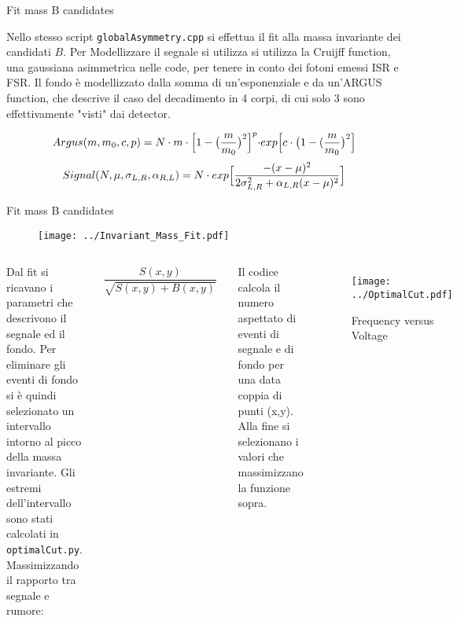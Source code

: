 \documentclass[8pt,a4paper]{beamer}
\begin{document}
\begin{frame}{Fit mass B candidates}

Nello stesso script \texttt{globalAsymmetry.cpp} si effettua il fit alla massa invariante dei candidati $B$. Per Modellizzare il segnale si utilizza si utilizza la Cruijff function, una gaussiana asimmetrica nelle code, per tenere in conto dei fotoni emessi ISR e FSR. Il fondo è modellizzato dalla somma di un'esponenziale e da un'ARGUS function, che descrive il caso del decadimento in 4 corpi, di cui solo 3 sono effettivamente "visti" dai detector.

\begin{equation}
Argus(m,m_{0},c,p) = N \cdot m \cdot \Bigl[1 - \big(\frac{m}{m_{0}} \big)^{2} \Bigl]^{p} \cdot exp \Bigl[c \cdot \big(1 - (\frac{m}{m_{0}}\big)^{2}  \Bigl]
\end{equation}
\begin{equation}
Signal(N,\mu, \sigma_{L,R}, \alpha_{R,L}) = N \cdot exp \Bigl[  \dfrac{ - (x - \mu)^2}{2 \sigma_{L,R}^{2} + \alpha_{L,R} (x - \mu)^2  }	\Bigl]
\end{equation}

\end{frame}

\begin{frame}{Fit mass B candidates}

\begin{figure}[hbtp]
\centering
\texttt{[image: ../Invariant\_Mass\_Fit.pdf]}
\end{figure}
\end{frame}

\begin{frame}
\begin{columns}
\centering
Dal fit si ricavano i parametri che descrivono il segnale ed il fondo. Per eliminare gli eventi di fondo si è quindi selezionato un intervallo intorno al picco della massa invariante. Gli estremi dell'intervallo sono stati calcolati in \texttt{optimalCut.py}.
Massimizzando il rapporto tra segnale e rumore:

\begin{align*}
\dfrac{S(x,y)}{\sqrt{S(x,y)+B(x,y)}}
\end{align*}

Il codice calcola il numero aspettato di eventi di segnale e di fondo per una data coppia di punti (x,y). Alla fine si selezionano i valori che massimizzano la funzione sopra. 
\begin{figure}
\texttt{[image: ../OptimalCut.pdf]}
\caption{Frequency versus Voltage}
\end{figure}
\end{columns}
\end{frame}
\end{document}

